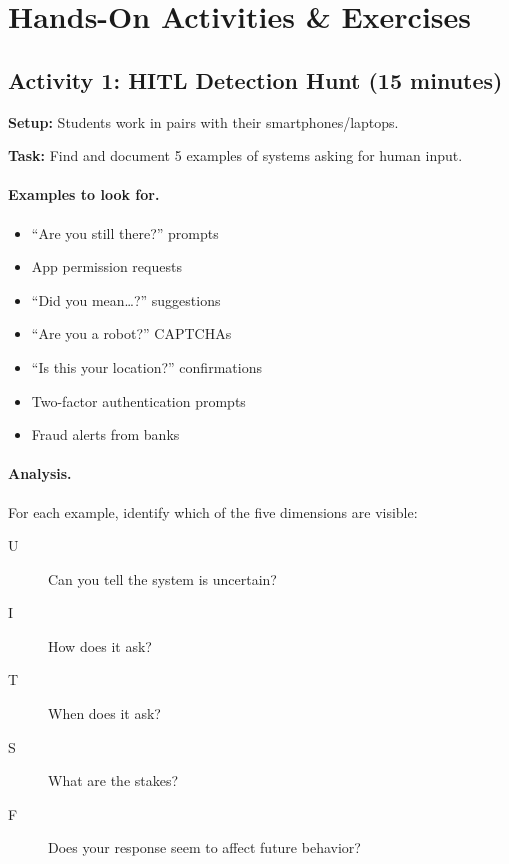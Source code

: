 \section{Hands-On Activities \& Exercises}

\subsection{Activity 1: HITL Detection Hunt (15 minutes)}

\textbf{Setup:} Students work in pairs with their smartphones/laptops.

\textbf{Task:} Find and document 5 examples of systems asking for human input.

\paragraph{Examples to look for.}
\begin{itemize}
    \item ``Are you still there?'' prompts
    \item App permission requests
    \item ``Did you mean\ldots?'' suggestions
    \item ``Are you a robot?'' CAPTCHAs
    \item ``Is this your location?'' confirmations
    \item Two-factor authentication prompts
    \item Fraud alerts from banks
\end{itemize}

\paragraph{Analysis.} For each example, identify which of the five dimensions are visible:
\begin{description}
    \item[U] Can you tell the system is uncertain?
    \item[I] How does it ask?
    \item[T] When does it ask?
    \item[S] What are the stakes?
    \item[F] Does your response seem to affect future behavior?
\end{description}


